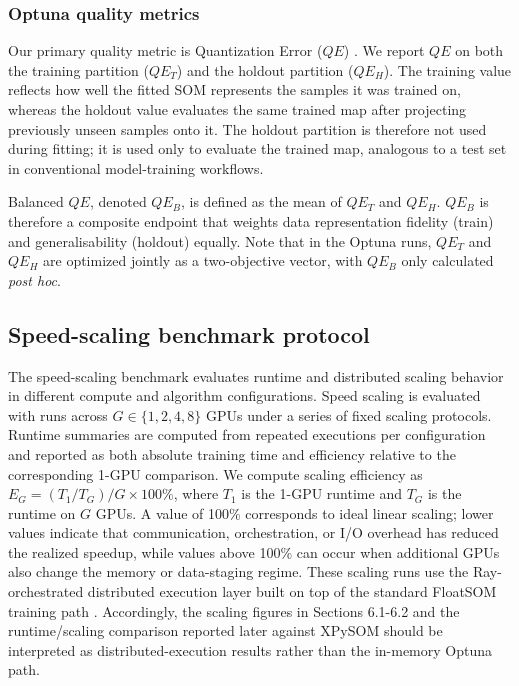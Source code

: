 \documentclass[10pt]{article} %
\begin{document}
\subsubsection{Optuna quality metrics}

Our primary quality metric is Quantization Error ($QE$) \citep{kohonenSelfOrganizingMaps2001}. We report $QE$ on both the training partition ($QE_T$) and the holdout partition ($QE_H$). The training value reflects how well the fitted SOM represents the samples it was trained on, whereas the holdout value evaluates the same trained map after projecting previously unseen samples onto it. The holdout partition is therefore not used during fitting; it is used only to evaluate the trained map, analogous to a test set in conventional model-training workflows.

Balanced $QE$, denoted $QE_B$, is defined as the mean of $QE_T$ and $QE_H$. $QE_B$ is therefore a composite endpoint that weights data representation fidelity (train) and generalisability (holdout) equally. Note that in the Optuna runs, $QE_T$ and $QE_H$ are optimized jointly as a two-objective vector, with $QE_B$ only calculated \emph{post hoc}.

\subsection{Speed-scaling benchmark protocol}

The speed-scaling benchmark evaluates runtime and distributed scaling behavior in different compute and algorithm configurations. Speed scaling is evaluated with runs across $G\in\{1,2,4,8\}$ GPUs under a series of fixed scaling protocols. Runtime summaries are computed from repeated executions per configuration and reported as both absolute training time and efficiency relative to the corresponding 1-GPU comparison. We compute scaling efficiency as $E_G=(T_1/T_G)/G \times 100\%$, where $T_1$ is the 1-GPU runtime and $T_G$ is the runtime on $G$ GPUs. A value of 100\% corresponds to ideal linear scaling; lower values indicate that communication, orchestration, or I/O overhead has reduced the realized speedup, while values above 100\% can occur when additional GPUs also change the memory or data-staging regime. These scaling runs use the Ray-orchestrated distributed execution layer built on top of the standard FloatSOM training path \citep{moritzRayDistributedFramework2018}. Accordingly, the scaling figures in Sections 6.1-6.2 and the runtime/scaling comparison reported later against XPySOM should be interpreted as distributed-execution results rather than the in-memory Optuna path.
\end{document}
